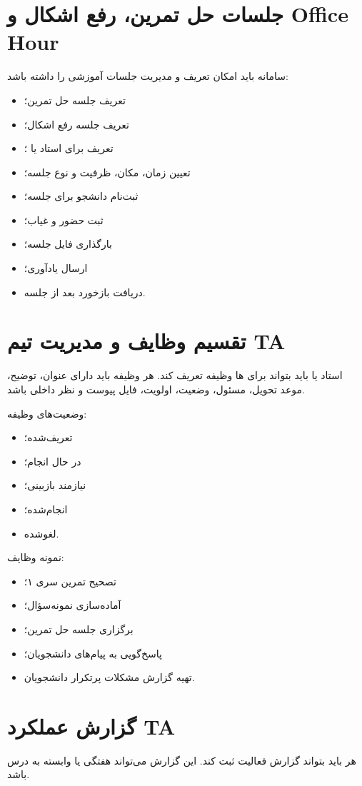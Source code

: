 \documentclass[12pt,a4paper]{article}
\begin{document}
\section{جلسات حل تمرین، رفع اشکال و Office Hour}
سامانه باید امکان تعریف و مدیریت جلسات آموزشی را داشته باشد:
\begin{itemize}
\item تعریف جلسه حل تمرین؛
\item تعریف جلسه رفع اشکال؛
\item تعریف  برای استاد یا ؛
\item تعیین زمان، مکان، ظرفیت و نوع جلسه؛
\item ثبت‌نام دانشجو برای جلسه؛
\item ثبت حضور و غیاب؛
\item بارگذاری فایل جلسه؛
\item ارسال یادآوری؛
\item دریافت بازخورد بعد از جلسه.
\end{itemize}

\section{تقسیم وظایف و مدیریت تیم TA}
استاد یا  باید بتواند برای ها وظیفه تعریف کند. هر وظیفه باید دارای عنوان، توضیح، موعد تحویل، مسئول، وضعیت، اولویت، فایل پیوست و نظر داخلی باشد.

وضعیت‌های وظیفه:
\begin{itemize}
\item تعریف‌شده؛
\item در حال انجام؛
\item نیازمند بازبینی؛
\item انجام‌شده؛
\item لغوشده.
\end{itemize}

نمونه وظایف:
\begin{itemize}
\item تصحیح تمرین سری ۱؛
\item آماده‌سازی نمونه‌سؤال؛
\item برگزاری جلسه حل تمرین؛
\item پاسخ‌گویی به پیام‌های دانشجویان؛
\item تهیه گزارش مشکلات پرتکرار دانشجویان.
\end{itemize}

\section{گزارش عملکرد TA}
هر  باید بتواند گزارش فعالیت ثبت کند. این گزارش می‌تواند هفتگی یا وابسته به درس باشد.
\end{document}
